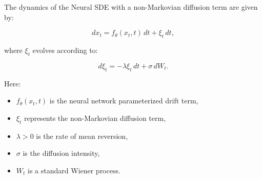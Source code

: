 \documentclass{article}
\begin{document}
The dynamics of the Neural SDE with a non-Markovian diffusion term are given by:

\[
dx_t = f_\theta(x_t, t) \, dt + \xi_t \, dt,
\]

where \( \xi_t \) evolves according to:

\[
d\xi_t = -\lambda \xi_t \, dt + \sigma \, dW_t.
\]

Here:
\begin{itemize}
    \item \( f_\theta(x_t, t) \) is the neural network parameterized drift term,
    \item \( \xi_t \) represents the non-Markovian diffusion term,
    \item \( \lambda > 0 \) is the rate of mean reversion,
    \item \( \sigma \) is the diffusion intensity,
    \item \( W_t \) is a standard Wiener process.
\end{itemize}
\end{document}
